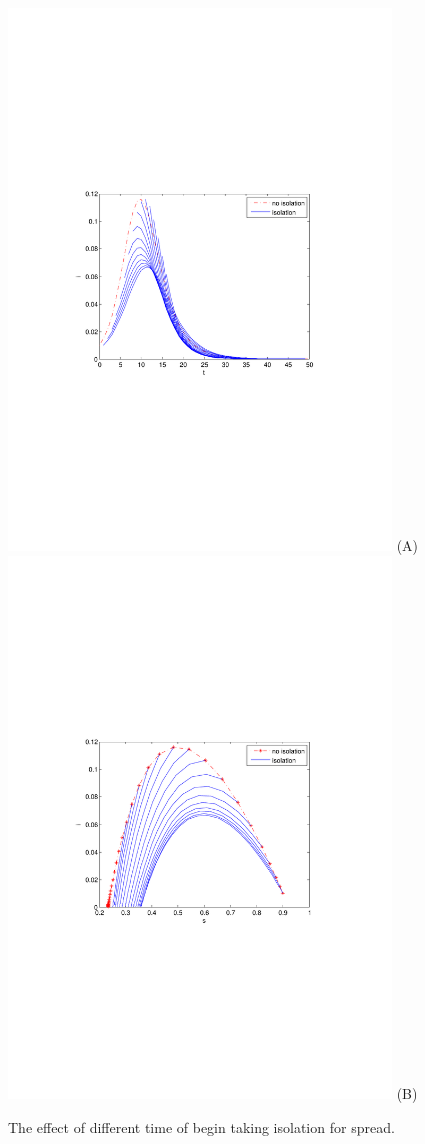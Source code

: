 \begin{figure}\centering
\includegraphics[width=4in]{imgs/iso_i_t.pdf}
\nline%
(A)
\\\nline%
\includegraphics[width=4in]{imgs/iso_i_s.pdf}
\nline%
(B)
\caption{The effect of different time of begin taking 
isolation for spread.}
\label{fig:4}
\end{figure}
